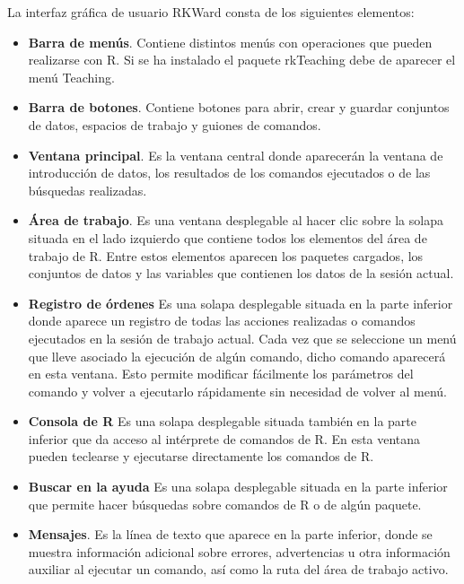 La interfaz gráfica de usuario RKWard consta de los siguientes elementos:
\begin{itemize}
\item \textbf{Barra de menús}. Contiene distintos menús con operaciones que pueden realizarse con R. 
Si se ha instalado el paquete rkTeaching debe de aparecer el menú Teaching. 
\item \textbf{Barra de botones}. Contiene botones para abrir, crear y guardar conjuntos de datos, espacios de trabajo y guiones de comandos. 
\item \textbf{Ventana principal}. Es la ventana central donde aparecerán la ventana de introducción de datos, los resultados de los comandos ejecutados o de las búsquedas realizadas. 
\item \textbf{Área de trabajo}. Es una ventana desplegable al hacer clic sobre la solapa situada en el lado izquierdo que contiene todos los elementos del área de trabajo de R.
Entre estos elementos aparecen los paquetes cargados, los conjuntos de datos y las variables que contienen los datos de la sesión actual. 
\item \textbf{Registro de órdenes} Es una solapa desplegable situada en la parte inferior donde aparece un registro de todas las acciones realizadas o comandos ejecutados en la sesión de trabajo actual.
Cada vez que se seleccione un menú que lleve asociado la ejecución de algún comando, dicho comando aparecerá en esta
ventana. Esto permite modificar fácilmente los parámetros del comando y volver a ejecutarlo rápidamente sin necesidad
de volver al menú. 
\item \textbf{Consola de R} Es una solapa desplegable situada también en la parte inferior que da acceso al intérprete de comandos de R.
En esta ventana pueden teclearse y ejecutarse directamente los comandos de R.
\item \textbf{Buscar en la ayuda} Es una solapa desplegable situada en la parte inferior que permite hacer búsquedas sobre comandos de R o de algún paquete.
\item \textbf{Mensajes}. Es la línea de texto que aparece en la parte inferior, donde se muestra información adicional sobre errores, advertencias u
otra información auxiliar al ejecutar un comando, así como la ruta del área de trabajo activo.  
\end{itemize}

